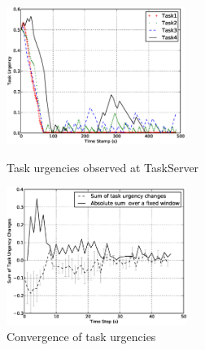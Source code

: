 \documentclass{llncs}
\begin{document}
\begin{figure}
\begin{minipage}[t]{0.5\linewidth}
\centering
\includegraphics[height=4.5cm, angle=0]
{images/global/GlobalPlotUrgencyLog-2010Feb18-151600-clear.eps}
\caption{\small Task urgencies observed at TaskServer}
\label{fig:raw-urgencies} %
\end{minipage}
\hspace{0.5cm}
\begin{minipage}[t]{0.5\linewidth}
\centering
\includegraphics[height=4.5cm, angle=0]{images/global/TaskUrgencyConvergence-step2-th-p1.eps}
\caption{\small Convergence of task urgencies}
\label{fig:urgency-convergence} %
\end{minipage}
\end{figure}
\end{document}
